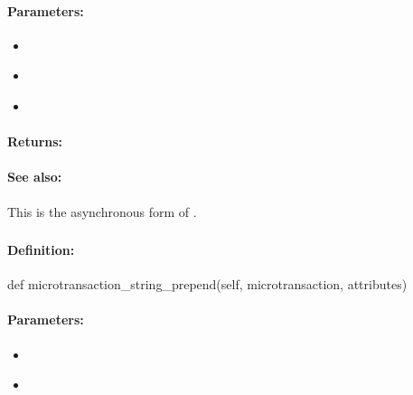 \paragraph{Parameters:}
\begin{itemize}[noitemsep]
\item {}\\

\item {}\\

\item {}\\

\end{itemize}

\paragraph{Returns:}


\paragraph{See also:}  This is the asynchronous form of .

\pagebreak
\subsubsection{}
\label{api:python:microtransaction_string_prepend}


\paragraph{Definition:}
\begin{pythoncode}
def microtransaction_string_prepend(self, microtransaction, attributes)
\end{pythoncode}

\paragraph{Parameters:}
\begin{itemize}[noitemsep]
\item {}\\

\item {}\\

\end{itemize}


